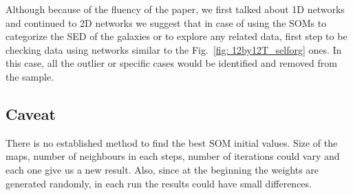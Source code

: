     Although because of the fluency of the paper, we first talked about 1D networks and continued to 2D networks we suggest that in case of using the SOMs to categorize the SED of the galaxies or to explore any related data, first step to be checking data using networks similar to the Fig.~\ref{fig: 12by12T_selforg} ones.
    In this case, all the outlier or specific cases would be identified and removed from the sample. 

    
    \subsection{Caveat}
    There is no established method to find the best SOM initial values. Size of the maps, number of neighbours in each steps, number of iterations could vary and each one give us a new result.
    Also, since at the beginning the weights are generated randomly, in each run the results could have small differences.
    
    